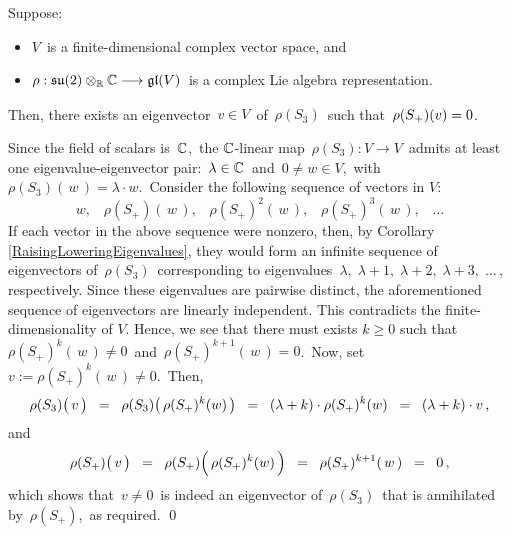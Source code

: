 \vskip 0.5cm
\begin{corollary}
\label{EigenvectorOfS3KilledBySplus}
\mbox{}
\vskip 0.1cm
\noindent
Suppose:
\begin{itemize}
\item
	$V$\, is a {\color{red}finite-dimensional} complex vector space, and
\item
	$\rho : \mathfrak{su}(2) \otimes_{\mathbb{R}} \mathbb{C} \longrightarrow \mathfrak{gl}(V)$\,
	is a complex Lie algebra representation.
\end{itemize}
Then, there exists an eigenvector \,$v \in V$\, of \,$\rho(S_{3})$\, such that
\,$\rho(\overset{{\color{white}.}}{S}_{+})(v) = 0$.\,
\end{corollary}
\proof
Since the field of scalars is \,$\mathbb{C}$,\, the $\mathbb{C}$-linear map
\,$\rho(S_{3}) : V \longrightarrow V$\,
admits at least one eigenvalue-eigenvector pair: \,$\lambda \in \mathbb{C}$\, and \,$0 \neq w \in V$,\,
with \,$\rho(S_{3})(\,w\,) = \lambda \cdot w$.\,
Consider the following sequence of vectors in $V$:
\begin{equation*}
w,\;\;\; \rho(S_{+})(\,w\,),\;\;\; \rho(S_{+})^{2}(\,w\,),\;\;\; \rho(S_{+})^{3}(\,w\,),\;\;\; \ldots
\end{equation*}
If each vector in the above sequence were nonzero, then,
by Corollary \ref{RaisingLoweringEigenvalues}, they would form an infinite sequence of eigenvectors of
\,$\rho(S_{3})$\, corresponding to eigenvalues \,$\lambda,\;\lambda+1,\;\lambda+2,\;\lambda+3,\;\ldots$\,,
respectively.
Since these eigenvalues are pairwise distinct, the aforementioned sequence of eigenvectors are linearly independent.
This contradicts the finite-dimensionality of $V$.
Hence, we see that there must exists $k \geq 0$ such that
\,$\rho(S_{+})^{k}(\,w\,) \neq 0$\, and \,$\rho(S_{+})^{k+1}(\,w\,) = 0$.\,
Now, set \,$v := \rho(S_{+})^{k}(\,w\,) \neq 0$.\,
Then,
\begin{equation*}
\rho(S_{3})\!\left(\,\overset{{\color{white}.}}{v}\,\right)
\;\; = \;\;
	\rho(S_{3})\!\left(\,\rho(S_{+})^{k}(\overset{{\color{white}.}}{w})\,\right)
\;\; = \;\;
	(\lambda + k) \cdot \rho(S_{+})^{k}(\overset{{\color{white}.}}{w})
\;\; = \;\;
	(\lambda + k) \cdot v\,,
\end{equation*}
and
\begin{equation*}
\rho(S_{+})\!\left(\,\overset{{\color{white}.}}{v}\,\right)
\;\; = \;\;
	\rho(S_{+})\!\left(\,\overset{{\color{white}1}}{\rho}(S_{+})^{k}(w)\,\right)
\;\; = \;\;
	\rho(S_{+})^{k+1}(\,w\,)
\;\; = \;\;
	0\,,
\end{equation*}
which shows that \,$v \neq 0$\, is indeed an eigenvector of \,$\rho(S_{3})$\, that is annihilated by
\,$\rho(S_{+})$,\, as required.
\qed

